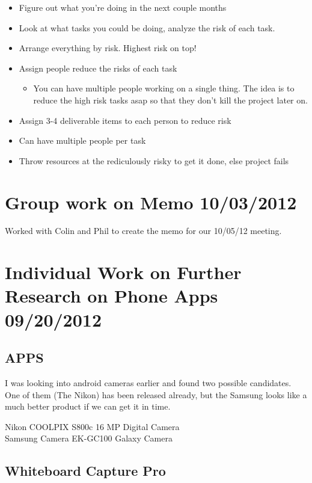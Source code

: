 \documentclass[]{article}
\begin{document}
		\begin{itemize}
			\item Figure out what you're doing in the next couple months
			\item Look at what tasks you could be doing, analyze the risk of each task.
			\item Arrange everything by risk. Highest risk on top!
			\item Assign people reduce the risks of each task
			\begin{itemize}
				\item You can have multiple people working on a single thing. The idea is to reduce the high risk tasks asap so that they don't kill the project later on.
			\end{itemize}
			\item Assign 3-4 deliverable items to each person to reduce risk
			\item Can have multiple people per task
			\item Throw resources at the rediculously risky to get it done, else project fails
		\end{itemize}
	\section{Group work on Memo 10/03/2012}
		Worked with Colin and Phil to create the memo for our 10/05/12 meeting.


	\section{Individual Work on Further Research on Phone Apps 09/20/2012}
	
		\subsection{APPS}
		I was looking into android cameras earlier and found two possible candidates. One of them (The Nikon) has been released already, but the Samsung looks like a much better product if we can get it in time.
		
		Nikon COOLPIX S800c 16 MP Digital Camera\\
		Samsung Camera EK-GC100 Galaxy Camera\\
	
			
		\subsection{Whiteboard Capture Pro}
		
\end{document}

